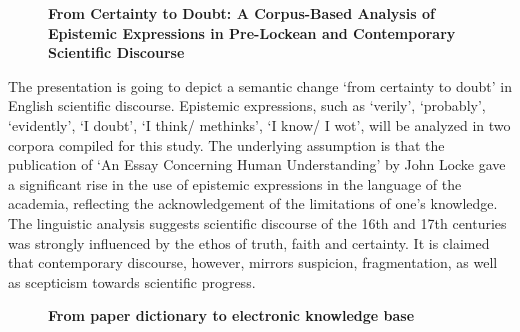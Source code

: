 \documentclass[10pt, a4paper, twopage, headinclude, footinclude, BCOR5mm]{book}
\begin{document}
\newpage

\begin{figure}[t!]
\centering
\large\textbf{From Certainty to Doubt: A Corpus-Based Analysis of Epistemic Expressions in Pre-Lockean and Contemporary Scientific Discourse}
\vspace*{0.5cm}
\end{figure}


\begin{table}[t!]
\end{table} 
\noindent
The presentation is going to depict a semantic change `from certainty to doubt' in English scientific discourse. Epistemic expressions, such as `verily', `probably', `evidently', `I doubt', `I think/ methinks', `I know/ I wot', will be analyzed in two corpora compiled for this study. The underlying assumption is that the publication of `An Essay Concerning Human Understanding' by John Locke gave a significant rise in the use of epistemic expressions in the language of the academia, reflecting the acknowledgement of the limitations of one's knowledge. The linguistic analysis suggests scientific discourse of the 16th and 17th centuries was strongly influenced by the ethos of truth, faith and certainty. It is claimed that contemporary discourse, however, mirrors suspicion, fragmentation, as well as scepticism towards scientific progress.    

\newpage

\begin{figure}[t!]
\centering
\large\textbf{From paper dictionary to electronic knowledge base}
\vspace*{0.5cm}
\end{figure}
\end{document}
